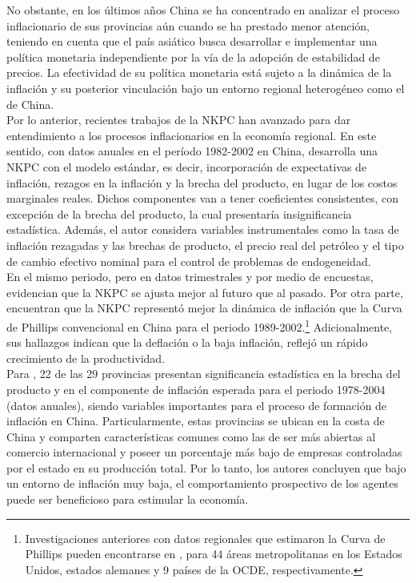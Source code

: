 No obstante, en los últimos años China se ha concentrado en analizar el proceso inflacionario de sus provincias aún cuando se ha prestado menor atención, teniendo en cuenta que el país asiático busca desarrollar e implementar una política monetaria independiente por la vía de la adopción de estabilidad de precios. La efectividad de su política monetaria está sujeto a la dinámica de la inflación y su posterior vinculación bajo un entorno regional heterogéneo como el de China.\\

Por lo anterior, recientes trabajos de la NKPC han avanzado para dar entendimiento a los procesos inflacionarios en la economía regional. En este sentido, con datos anuales en el período 1982-2002 en China, \cite{funke2006inflation}  desarrolla una NKPC con el modelo estándar, es decir, incorporación de expectativas de inflación, rezagos en la inflación y  la brecha del producto, en lugar de los costos marginales reales. Dichos componentes van a tener coeficientes consistentes, con excepción de la brecha del producto, la cual presentaría insignificancia estadística. Además, el autor considera variables instrumentales como la tasa de inflación rezagadas y las brechas de producto, el precio real del petróleo y el tipo de cambio efectivo nominal para el control de problemas de endogeneidad. \\

En el mismo periodo, pero en datos trimestrales y por medio de encuestas, \cite{scheibe2005phillips} evidencian que la NKPC se ajusta mejor al futuro que al pasado. Por otra parte, \cite{ha2003causes} encuentran que la NKPC representó mejor la dinámica de inflación que la Curva de Phillips convencional en China para el periodo 1989-2002.\footnote{Investigaciones anteriores con datos regionales que estimaron la Curva de Phillips pueden encontrarse en \cite{coen1999nairu,hassler2003inflation,dinardo1999phillips}, para  44 áreas metropolitanas en los Estados Unidos, estados alemanes y 9 países de la OCDE, respectivamente.}    Adicionalmente, sus hallazgos indican que la deflación o la baja inflación, reflejó un rápido crecimiento de la productividad.\\

Para \cite{mehrotra2010modelling}, 22 de las 29 provincias presentan significancia estadística en la brecha del producto y en el componente de inflación esperada para el periodo 1978-2004 (datos anuales), siendo variables importantes para el proceso de formación de inflación en China. Particularmente, estas provincias se ubican en la costa de China  y comparten características comunes como las de ser más abiertas al comercio internacional y poseer un porcentaje más bajo de empresas controladas por el estado en su producción total.  Por lo tanto, los autores concluyen que bajo un entorno de inflación muy baja, el comportamiento prospectivo de los agentes puede ser beneficioso para estimular la economía.\\%

